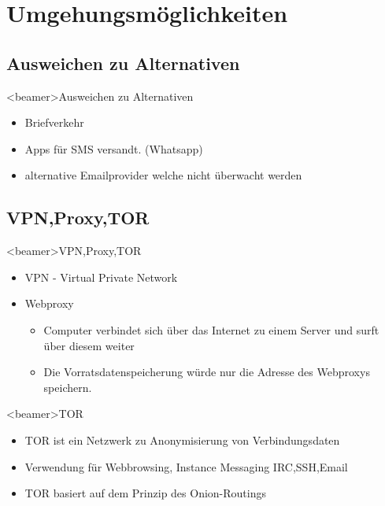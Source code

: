 \section{Umgehungsmöglichkeiten}
  \subsection{Ausweichen zu Alternativen}
    \begin{frame}<beamer>{Ausweichen zu Alternativen}
      \begin{itemize}
        \item Briefverkehr
        \item Apps für SMS versandt. (Whatsapp)
        \item alternative Emailprovider welche nicht überwacht werden
        

      \end{itemize}
    \end{frame}
      \subsection{VPN,Proxy,TOR}
    \begin{frame}<beamer>{VPN,Proxy,TOR}
      \begin{itemize}
        \item VPN - Virtual Private Network 
        \item Webproxy
               \begin{itemize}
         \item Computer verbindet sich über das Internet zu einem Server und surft über diesem weiter
         \item Die Vorratsdatenspeicherung würde nur die Adresse des Webproxys speichern.
  
      \end{itemize}
      \end{itemize}
    \end{frame}
        \begin{frame}<beamer>{TOR}
      \begin{itemize}
        \item TOR ist ein Netzwerk zu Anonymisierung von Verbindungsdaten
        \item Verwendung für Webbrowsing, Instance Messaging IRC,SSH,Email
        \item TOR basiert auf dem Prinzip des Onion-Routings
   
      \end{itemize}
    \end{frame}






